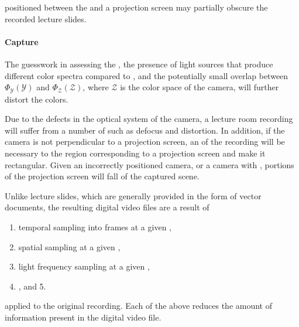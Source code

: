  positioned between the  and a projection
screen may partially obscure the recorded lecture slides.

\paragraph{Capture} The guesswork in assessing the ,
the presence of light sources that produce different color spectra compared to
, and the potentially small overlap between $\Phi_{\mathcal
Y}(\mathcal Y)$ and $\Phi_{\mathcal Z}(\mathcal Z)$, where $\mathcal Z$ is the
color space of the camera, will further distort the colors.

Due to the defects in the optical system of the camera, a lecture room
recording will suffer from a number of  such as defocus and
distortion. In addition, if the camera is not perpendicular to a projection
screen, an  of the recording will be necessary to
 the region corresponding to a projection screen and make it
rectangular. Given an incorrectly positioned camera, or a camera with
, portions of the projection screen will fall  of the captured scene.

Unlike lecture slides, which are generally provided in the form of vector
 documents, the resulting digital video files are a result of
\begin{enumerate}
  \item temporal sampling into frames at a given ,
  \item spatial sampling at a given ,
  \item light frequency sampling at a given ,
  \item {}, and 5. 
\end{enumerate}
applied to the original recording. Each of the above reduces the amount of
information present in the digital video file.

